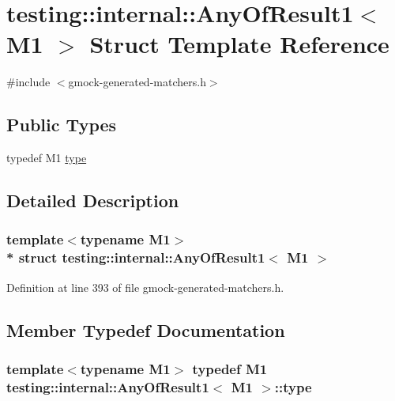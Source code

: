 \hypertarget{structtesting_1_1internal_1_1_any_of_result1}{}\section{testing\+:\+:internal\+:\+:Any\+Of\+Result1$<$ M1 $>$ Struct Template Reference}
\label{structtesting_1_1internal_1_1_any_of_result1}


{\ttfamily \#include $<$gmock-\/generated-\/matchers.\+h$>$}

\subsection*{Public Types}
\begin{DoxyCompactItemize}
\item 
typedef M1 \hyperlink{structtesting_1_1internal_1_1_any_of_result1_a4c55b5cf196c93e2a822bc99625f6797}{type}
\end{DoxyCompactItemize}


\subsection{Detailed Description}
\subsubsection*{template$<$typename M1$>$\\*
struct testing\+::internal\+::\+Any\+Of\+Result1$<$ M1 $>$}



Definition at line 393 of file gmock-\/generated-\/matchers.\+h.



\subsection{Member Typedef Documentation}
\subsubsection[{\texorpdfstring{type}{type}}]{\setlength{\rightskip}{0pt plus 5cm}template$<$typename M1$>$ typedef M1 {\bf testing\+::internal\+::\+Any\+Of\+Result1}$<$ M1 $>$\+::{\bf type}}\hypertarget{structtesting_1_1internal_1_1_any_of_result1_a4c55b5cf196c93e2a822bc99625f6797}{}\label{structtesting_1_1internal_1_1_any_of_result1_a4c55b5cf196c93e2a822bc99625f6797}


